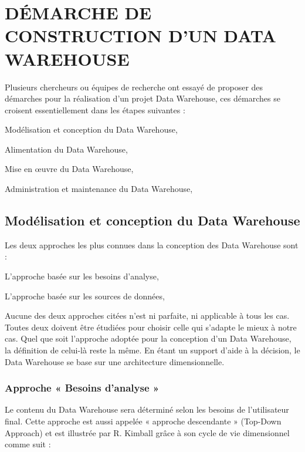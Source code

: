    
   
\section{DÉMARCHE DE CONSTRUCTION D’UN DATA WAREHOUSE}   
   Plusieurs chercheurs ou équipes de recherche ont essayé de proposer des démarches pour la réalisation d’un projet Data Warehouse, ces démarches se croisent essentiellement dans les étapes suivantes :
\begin{list}{•}{ }
   \item Modélisation et conception du Data Warehouse,
   \item Alimentation du Data Warehouse,
   \item Mise en œuvre du Data Warehouse,
   \item Administration et maintenance du Data Warehouse,\\
\end{list}

\subsection{Modélisation et conception du Data Warehouse}

Les deux approches les plus connues dans la conception des Data Warehouse sont :
\begin{list}{•}{ }
   \item L’approche basée sur les besoins d’analyse,
    \item L’approche basée sur les sources de données,\\
\end{list}
Aucune des deux approches citées n’est ni parfaite, ni applicable à tous les cas. Toutes deux doivent être étudiées pour choisir celle qui s’adapte le mieux à notre cas. Quel que soit l’approche adoptée pour la conception d’un Data Warehouse, la définition de celui-là reste la même. En étant un support d’aide à la décision, le Data Warehouse se base sur une architecture dimensionnelle.


 \subsubsection{Approche « Besoins d’analyse »}
 
  Le contenu du Data Warehouse sera déterminé selon les besoins de l’utilisateur final. Cette approche est aussi appelée « approche descendante » (Top-Down Approach) et est illustrée par R. Kimball grâce à son cycle de vie dimensionnel comme suit :
  
